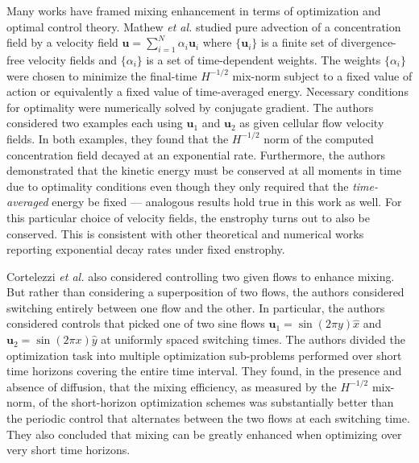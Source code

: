 Many works \cite{DAlessandro1999a, Liu2006, Mathew2007b, Cortelezzi2008, DF2014, JFM2011, JMP2012, Farazmand, Balasuriya2005, Hobbs1998, Vikhansky2002} have framed mixing enhancement in terms of optimization and optimal control theory. Mathew {\it et al.} \cite{Mathew2007b} studied pure advection of a concentration field by a velocity field $\mathbf{u}=\sum_{i=1}^{N}\alpha_{i}\mathbf{u}_{i}$ where $\{\mathbf{u}_{i}\}$ is a finite set of divergence-free velocity fields and $\{\alpha_{i}\}$ is a set of time-dependent weights. The weights $\{\alpha_{i}\}$ were chosen to minimize the final-time $H^{-1/2}$ mix-norm subject to a fixed value of action or equivalently a fixed value of time-averaged energy. Necessary conditions for optimality were numerically solved by conjugate gradient. The authors considered two examples each using $\mathbf{u}_{1}$ and $\mathbf{u}_{2}$ as given cellular flow velocity fields. In both examples, they found that the $H^{-1/2}$ norm of the computed concentration field decayed at an exponential rate. Furthermore, the authors demonstrated that the kinetic energy must be conserved at all moments in time due to optimality conditions even though they only required that the {\it time-averaged} energy be fixed --- analogous results hold true in this work as well. For this particular choice of velocity fields, the enstrophy turns out to also be conserved. This is consistent with other theoretical and numerical works \cite{CS2013,GI2014,JFM2011,Alberti2014a} reporting exponential decay rates under fixed enstrophy.   

Cortelezzi {\it et al.} \cite{Cortelezzi2008} also considered controlling two given flows to enhance mixing. But rather than considering a superposition of two flows, the authors considered switching entirely between one flow and the other. In particular, the authors considered controls that picked one of two sine flows $\mathbf{u}_{1}=\sin(2\pi y)\hat{x}$ and $\mathbf{u}_{2}=\sin(2\pi x)\hat{y}$ at uniformly spaced switching times. The authors divided the optimization task into multiple optimization sub-problems performed over short time horizons covering the entire time interval. They found, in the presence and absence of diffusion, that the mixing efficiency, as measured by the $H^{-1/2}$ mix-norm, of the short-horizon optimization schemes was substantially better than the periodic control that alternates between the two flows at each switching time. They also concluded that mixing can be greatly enhanced when optimizing over very short time horizons.
 
